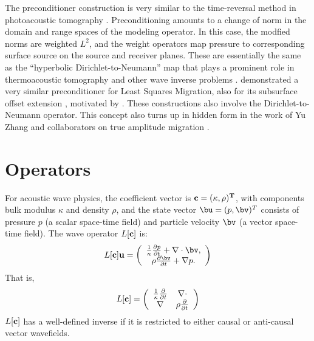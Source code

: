 The preconditioner construction is very similar to the time-reversal
method in photoacoustic tomography
\cite[]{StefanovUhlmannIP:09}. Preconditioning amounts to a change of
norm in the domain and range spaces of the modeling operator. In this
case, the modfied norms are weighted $L^2$, and the weight operators
map pressure to corresponding surface source on the source and
receiver planes. These are essentially the same as the ``hyperbolic
Dirichlet-to-Neumann'' map that plays a prominent role in
thermoacoustic tomography and other wave inverse problems
\cite[]{Rachele:00,StefUhl:05}. \cite{HouSymes:EAGE16} demonstrated a
very similar preconditioner for Least Squares Migration, also for its
subsurface offset extension \cite[]{HouSymes:16}, motivated by
\cite{tenKroode:12}. These constructions also involve the
Dirichlet-to-Neumann operator. This concept also turns up in hidden
form in the work of Yu Zhang and collaborators on true amplitude
migration
\cite[]{YuZhang:14,TangXuZhang:13,XuWang:2012,XuZhangTang:11,Zhang:SEG09}.


\section{Operators}

For acoustic wave physics, the coefficient vector is
$\bf{c}=(\kappa,\rho)^T$, with components bulk modulus $\kappa$ and
density $\rho$, and the state vector $\bu=(p,\bv)^T$ consists of
pressure $p$ (a scalar space-time field) and particle velocity $\bv$
(a vector space-time field). The wave operator $L[\bf{c}]$ is:
\begin{equation}
\label{eqn:aweop}
L[\bf{c}]\bf{u} = 
\left(
\begin{array}{c}
\frac{1}{\kappa}\frac{\partial p}{\partial t}  + \nabla \cdot \bv, \\
\rho\frac{\partial \bv}{\partial t} + \nabla p.
\end{array}
\right) 
\end{equation}
That is,
\begin{equation}
  \label{eqn:awemat}
  L[{\bf c}] = \left(
    \begin{array}{cc}
      \frac{1}{\kappa}\frac{\partial}{\partial t} & \nabla \cdot \\
      \nabla & \rho \frac{\partial}{\partial t}
    \end{array}
  \right)
\end{equation}
$L[{\bf c}]$ has a well-defined inverse if it is restricted to either
causal or anti-causal vector wavefields.

